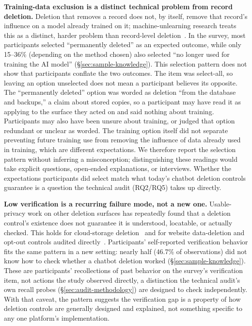 \documentclass[conference,compsoc]{IEEEtran}
\begin{document}
\textbf{Training-data exclusion is a distinct technical problem from record
deletion.} Deletion that removes a record does not, by itself, remove
that record's influence on a model already trained on it; machine-unlearning
research treats this as a distinct, harder problem than record-level
deletion~\cite{bourtoule2021machine}. In the survey, most participants
selected ``permanently deleted'' as an expected outcome, while only 15--36\%
(depending on the method chosen) also selected ``no longer used for training the AI model''
(\S\ref{sec:sample-knowledge}). This selection pattern does not show that
participants conflate the two outcomes. The item was select-all, so leaving an
option unselected does not mean a participant believes its opposite. The
``permanently deleted'' option was worded as deletion ``from the database and
backups,'' a claim about stored copies, so a participant may have read it as
applying to the surface they acted on and said nothing about training.
Participants may also have been unsure about training, or judged that option
redundant or unclear as worded. The training option itself did not separate
preventing future training use from removing the influence of data already
used in training, which are different expectations. We therefore report the
selection pattern without inferring a misconception; distinguishing these
readings would take explicit questions, open-ended explanations, or
interviews. Whether the expectations participants did select match what
today's chatbot deletion controls guarantee is a question the technical
audit (RQ2/RQ5) takes up directly.

\textbf{Low verification is a recurring failure mode, not a new one.}
Usable-privacy work on other deletion surfaces has repeatedly found that
a deletion control's existence does not guarantee it is understood,
locatable, or actually checked. This holds for cloud-storage
deletion~\cite{ramokapane2017stupid} and for website data-deletion and
opt-out controls audited directly~\cite{habib2019empirical}.
Participants' self-reported verification behavior fits the same pattern
in a new setting: nearly half (46.7\% of observations) did not know how
to check whether a chatbot deletion worked (\S\ref{sec:sample-knowledge}). These are participants' recollections of
past behavior on the survey's verification item, not actions the study
observed directly, a distinction the technical audit's own recall probes
(\S\ref{sec:audit-methodology}) are designed to check independently. With
that caveat, the pattern suggests the verification gap is a property of
how deletion controls are generally designed and explained, not something
specific to any one platform's implementation.
\end{document}
